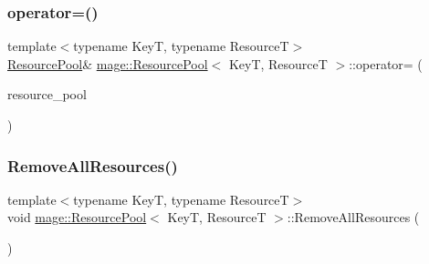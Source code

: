 \hypertarget{classmage_1_1_resource_pool_a1c0c196460508108435c227c11a65b94}{}\label{classmage_1_1_resource_pool_a1c0c196460508108435c227c11a65b94} 
\subsubsection{\texorpdfstring{operator=()}{operator=()}\hspace{0.1cm}{\footnotesize\ttfamily [2/2]}}
{\footnotesize\ttfamily template$<$typename KeyT, typename ResourceT$>$ \\
\hyperlink{classmage_1_1_resource_pool}{Resource\+Pool}\& \hyperlink{classmage_1_1_resource_pool}{mage\+::\+Resource\+Pool}$<$ KeyT, ResourceT $>$\+::operator= (\begin{DoxyParamCaption}\item[{\hyperlink{classmage_1_1_resource_pool}{Resource\+Pool}$<$ KeyT, ResourceT $>$ \&\&}]{resource\+\_\+pool }\end{DoxyParamCaption})\hspace{0.3cm}{\ttfamily [delete]}}

\hypertarget{classmage_1_1_resource_pool_a83a33e15bd8f326d0ebc11b3f8e52a41}{}\label{classmage_1_1_resource_pool_a83a33e15bd8f326d0ebc11b3f8e52a41} 
\subsubsection{\texorpdfstring{Remove\+All\+Resources()}{RemoveAllResources()}}
{\footnotesize\ttfamily template$<$typename KeyT, typename ResourceT$>$ \\
void \hyperlink{classmage_1_1_resource_pool}{mage\+::\+Resource\+Pool}$<$ KeyT, ResourceT $>$\+::Remove\+All\+Resources (\begin{DoxyParamCaption}{ }\end{DoxyParamCaption})}

\hypertarget{classmage_1_1_resource_pool_acda87b2a5cc6ea3880f40df0ac6fb4d9}{}\label{classmage_1_1_resource_pool_acda87b2a5cc6ea3880f40df0ac6fb4d9} 
